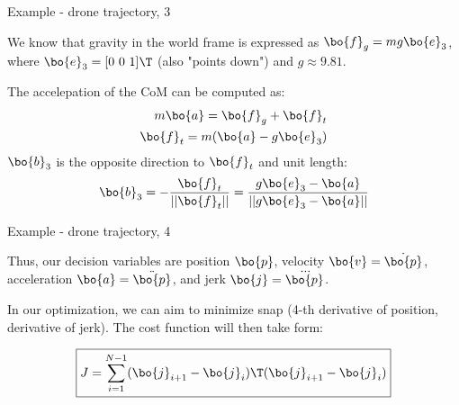 \begin{frame}{Example - drone trajectory, 3}
	\begin{flushleft}
		
		We know that gravity in the world frame is expressed as $\bo{f}_g = mg \bo{e}_3$, where $\bo{e}_3 = [0 \ 0 \ 1 ]\T$ (also "points down") and $g \approx 9.81$.
		
		\bigskip
		
		The accelepation of the CoM can be computed as:
		\begin{align}
			m \bo{a} = \bo{f}_g + \bo{f}_t 
			\\
			\bo{f}_t = m (\bo{a} - g \bo{e}_3)
		\end{align}
		$\bo{b}_3$ is the opposite direction to $\bo{f}_t$ and unit length:
		\begin{align}
			 \bo{b}_3 = -\frac{\bo{f}_t}{||\bo{f}_t||} =  \frac{g \bo{e}_3 - \bo{a}}{||g \bo{e}_3 - \bo{a}||}
		\end{align}
		
		
		
	\end{flushleft}
\end{frame}


\begin{frame}{Example - drone trajectory, 4}
	\begin{flushleft}
		
		Thus, our decision variables are position $\bo{p}$, velocity $\bo{v} = \dot{\bo{p}}$, acceleration $\bo{a} = \ddot{\bo{p}}$, and jerk $\bo{j} = \dddot{\bo{p}}$. 
		
		\bigskip
		
		In our optimization, we can aim to minimize snap (4-th derivative of position, derivative of jerk). The cost function will then take form:
		
		\begin{equation}
			\boxed{
			J = \sum_{i = 1}^{N-1} ( \bo{j}_{i+1} - \bo{j}_i)\T ( \bo{j}_{i+1} - \bo{j}_i) }
		\end{equation}
		
		
	\end{flushleft}
\end{frame}



